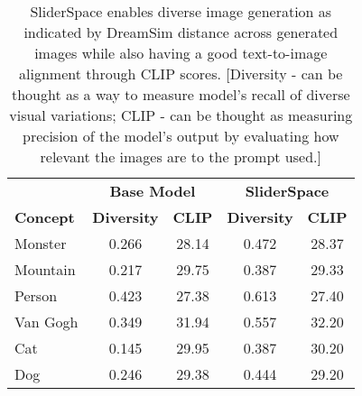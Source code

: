 \begin{table}
    \centering
   \begin{tabular}{lcccc}
        & \multicolumn{2}{c}{\textbf{Base Model}} & \multicolumn{2}{c}{\textbf{SliderSpace}} \\
        \textbf{Concept} & \textbf{Diversity} & \textbf{CLIP} & \textbf{Diversity} & \textbf{CLIP} \\
        \hline
        Monster & 0.266  & 28.14 & 0.472  & 28.37 \\
        Mountain & 0.217  & 29.75 & 0.387  & 29.33 \\
        Person & 0.423 & 27.38 & 0.613 & 27.40 \\
        Van Gogh & 0.349  & 31.94 & 0.557  & 32.20 \\
        Cat & 0.145  & 29.95 & 0.387  & 30.20 \\
        Dog & 0.246  & 29.38 & 0.444 & 29.20 \\

    \end{tabular}
    \caption{SliderSpace enables diverse image generation as indicated by DreamSim\cite{dreamsim} distance across generated images while also having a good text-to-image alignment through CLIP scores. [Diversity - can be thought as a way to measure model's recall of diverse visual variations; CLIP - can be thought as measuring precision of the model's output by evaluating how relevant the images are to the prompt used.]}
    \label{tab:dreamsim}
\end{table}